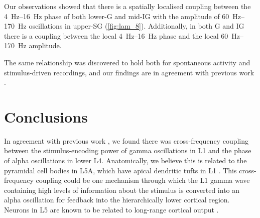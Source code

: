 Our observations showed that there is a spatially localised coupling between the \SIrange{4}{16}{Hz} phase of both lower-\ac{G} and mid-\ac{IG} with the amplitude of \SIrange{60}{170}{Hz} oscillations in upper-\ac{SG} (\autoref{fig:lam_8}).
Additionally, in both \ac{G} and \ac{IG} there is a coupling between the local \SIrange{4}{16}{Hz} phase and the local \SIrange{60}{170}{Hz} amplitude.

The same relationship was discovered to hold both for spontaneous activity and stimulus-driven recordings, and our findings are in agreement with previous work \citep{Spaak2012}.


\section{Conclusions}

In agreement with previous work \citep{Spaak2012}, we found there was cross-frequency coupling between the stimulus-encoding power of gamma oscillations in \ac{L1} and the phase of alpha oscillations in lower \ac{L4}.
Anatomically, we believe this is related to the pyramidal cell bodies in \ac{L5A}, which have apical dendritic tufts in \ac{L1} \citep{Hill2013,Zhu2004}.
This cross-frequency coupling could be one mechanism through which the \ac{L1} gamma wave containing high levels of information about the stimulus is converted into an alpha oscillation for feedback into the hierarchically lower cortical region.
Neurons in \ac{L5} are known to be related to long-range cortical output \citep{Hill2013}.

